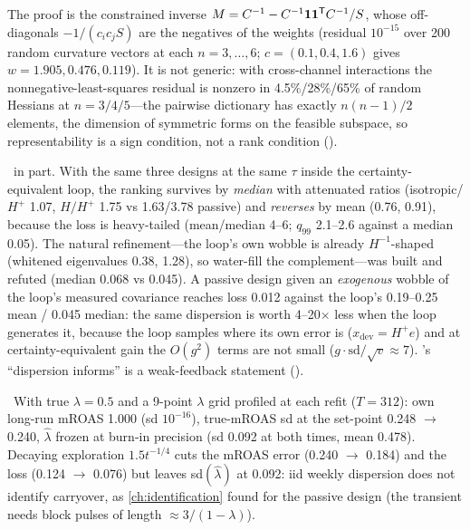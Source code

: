 The proof is the constrained inverse $M = C^{-1} - C^{-1}\mathbf{1}\mathbf{1}^{\mathsf{T}} C^{-1}/S$, whose off-diagonals $-1/(c_ic_jS)$ are the negatives of the weights (residual $10^{-15}$ over 200 random curvature vectors at each $n = 3, \ldots, 6$; $c = (0.1, 0.4, 1.6)$ gives $w = 1.905, 0.476, 0.119$). It is not generic: with cross-channel interactions the nonnegative-least-squares residual is nonzero in 4.5\%/28\%/65\% of random Hessians at $n = 3/4/5$---the pairwise dictionary has exactly $n(n-1)/2$ elements, the dimension of symmetric forms on the feasible subspace, so representability is a sign condition, not a rank condition ().

\begin{remark}
\label{fb:rem:bend}
\tagRefuted\ in part. With the same three designs at the same $\tau$ inside the certainty-equivalent loop, the ranking survives by \emph{median} with attenuated ratios (isotropic/$H^+$ 1.07, $H/H^+$ 1.75 vs 1.63/3.78 passive) and \emph{reverses} by mean (0.76, 0.91), because the loss is heavy-tailed (mean/median 4--6; $q_{99}$ 2.1--2.6 against a median 0.05). The natural refinement---the loop's own wobble is already $H^{-1}$-shaped (whitened eigenvalues 0.38, 1.28), so water-fill the complement---was built and refuted (median 0.068 vs 0.045). A passive design given an \emph{exogenous} wobble of the loop's measured covariance reaches loss 0.012 against the loop's 0.19--0.25 mean / 0.045 median: the same dispersion is worth 4--20$\times$ less when the loop generates it, because the loop samples where its own error is ($x_{\mathrm{dev}} = H^+e$) and at certainty-equivalent gain the $O(g^2)$ terms are not small ($g\cdot\mathrm{sd}/\sqrt v \approx 7$). 's ``dispersion informs'' is a weak-feedback statement ().
\end{remark}

\begin{proposition}
\label{fb:prop:adstock}
\tagNumerical\ With true $\lambda = 0.5$ and a 9-point $\lambda$ grid profiled at each refit ($T = 312$): own long-run mROAS 1.000 (sd $10^{-16}$), true-mROAS sd at the set-point 0.248 $\to$ 0.240, $\hat\lambda$ frozen at burn-in precision (sd 0.092 at both times, mean 0.478). Decaying exploration $1.5t^{-1/4}$ cuts the mROAS error (0.240 $\to$ 0.184) and the loss (0.124 $\to$ 0.076) but leaves sd$(\hat\lambda)$ at 0.092: iid weekly dispersion does not identify carryover, as \cref{ch:identification} found for the passive design (the transient needs block pulses of length $\approx 3/(1-\lambda)$).
\end{proposition}

